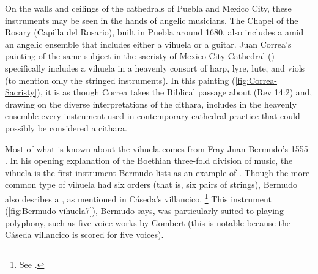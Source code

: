 On the walls and ceilings of the cathedrals of Puebla and Mexico City, these instruments may be seen in the hands of angelic musicians.
The Chapel of the Rosary (Capilla del Rosario), built in Puebla around 1680, also includes a  amid an angelic ensemble that includes either a vihuela or a guitar.
Juan Correa's painting of the same subject in the sacristy of Mexico City Cathedral () specifically includes a vihuela in a heavenly consort of harp, lyre, lute, and viols (to mention only the stringed instruments).
In this painting (\cref{fig:Correa-Sacristy}), it is as though Correa takes the Biblical passage about  (Rev 14:2) and, drawing on the diverse interpretations of the cithara, includes in the heavenly ensemble every instrument used in contemporary cathedral practice that could possibly be considered a cithara.



Most of what is known about the vihuela comes from Fray Juan Bermudo's 1555 %
	\autocite{Bermudo:Declaracion}.
In his opening explanation of the Boethian three-fold division of music, the vihuela is the first instrument Bermudo lists as an example of  .
Though the more common type of vihuela had six orders (that is, six pairs of strings), Bermudo also desribes a , as mentioned in Cáseda's villancico.%
	\footnote{%
	See \autocite[90v--110r]{Bermudo:Declaracion}.
	}
This instrument (\cref{fig:Bermudo-vihuela7}), Bermudo says, was particularly suited to playing polyphony, such as five-voice works by Gombert (this is notable because the Cáseda villancico is scored for five voices).


